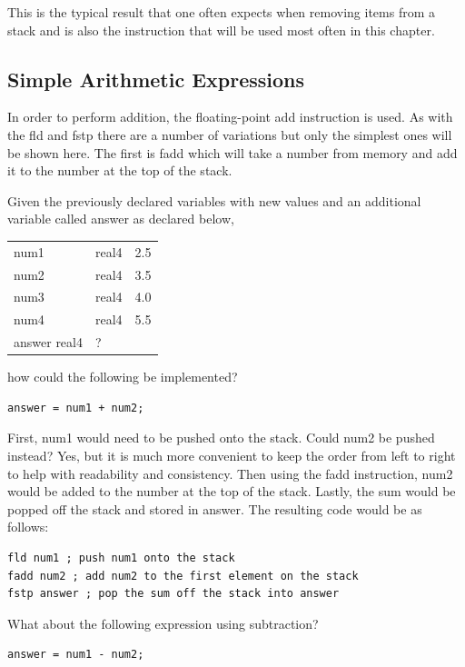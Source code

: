 \documentclass[10pt]{article}
\begin{document}
This is the typical result that one often expects when removing items from a stack and is also the instruction that will be used most often in this chapter.

\subsection*{Simple Arithmetic Expressions}
In order to perform addition, the floating-point add instruction is used. As with the fld and fstp there are a number of variations but only the simplest ones will be shown here. The first is fadd which will take a number from memory and add it to the number at the top of the stack.

Given the previously declared variables with new values and an additional variable called answer as declared below,

\begin{center}
\begin{tabular}{lll}
num1 & real4 & 2.5 \\
num2 & real4 & 3.5 \\
num3 & real4 & 4.0 \\
num4 & real4 & 5.5 \\
answer real4 & ? &  \\
\end{tabular}
\end{center}

how could the following be implemented?

\begin{verbatim}
answer = num1 + num2;
\end{verbatim}

First, num1 would need to be pushed onto the stack. Could num2 be pushed instead? Yes, but it is much more convenient to keep the order from left to right to help with readability and consistency. Then using the fadd instruction, num2 would be added to the number at the top of the stack. Lastly, the sum would be popped off the stack and stored in answer. The resulting code would be as follows:

\begin{verbatim}
fld num1 ; push num1 onto the stack
fadd num2 ; add num2 to the first element on the stack
fstp answer ; pop the sum off the stack into answer
\end{verbatim}

What about the following expression using subtraction?

\begin{verbatim}
answer = num1 - num2;
\end{verbatim}
\end{document}
